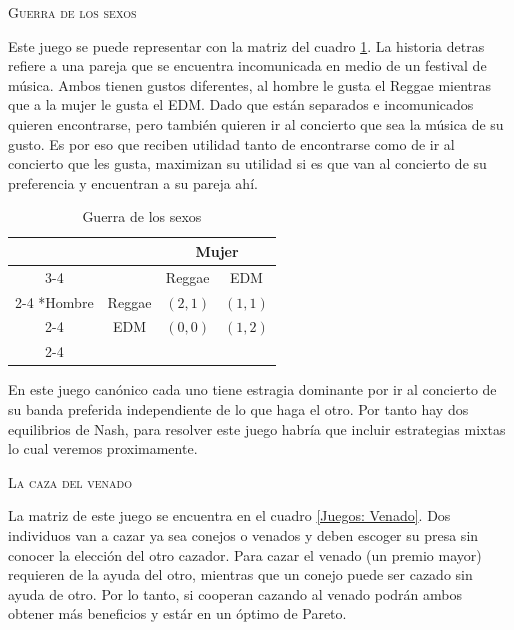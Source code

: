 
\textsc{Guerra de los sexos}

Este juego se puede representar con la matriz del cuadro \ref{Juegos: Guerra}. La historia detras refiere a una pareja que se encuentra incomunicada en medio de un festival de música. Ambos tienen gustos diferentes, al hombre le gusta el Reggae mientras que a la mujer le gusta el EDM. Dado que están separados e incomunicados quieren encontrarse, pero también quieren ir al concierto que sea la música de su gusto. Es por eso que reciben utilidad tanto de encontrarse como de ir al concierto que les gusta, maximizan su utilidad si es que van al concierto de su preferencia y encuentran a su pareja ahí.
\begin{table}[!htbp]
    \centering
    \caption{Guerra de los sexos}
    \setlength{\extrarowheight}{2pt}
    \begin{tabular}{*{4}{c|}}
      \multicolumn{2}{c}{} & \multicolumn{2}{c}{Mujer}\\\cline{3-4}
      \multicolumn{1}{c}{} &  & Reggae  & EDM \\\cline{2-4}
      \multirow{2}*{Hombre}  & Reggae & $(2,1)$ & $(1,1)$ \\\cline{2-4}
      & EDM & $(0,0)$ & $(1,2)$ \\\cline{2-4}
    \end{tabular} \label{Juegos: Guerra}
  \end{table}

En este juego canónico cada uno tiene estragia dominante por ir al concierto de su banda preferida independiente de lo que haga el otro. Por tanto hay dos equilibrios de Nash, para resolver este juego habría que incluir estrategias mixtas lo cual veremos proximamente.

\textsc{La caza del venado}

La matriz de este juego se encuentra en el cuadro \ref{Juegos: Venado}. Dos individuos van a cazar ya sea conejos o venados y deben escoger su presa sin conocer la elección del otro cazador. Para cazar el venado (un premio mayor) requieren de la ayuda del otro, mientras que un conejo puede ser cazado sin ayuda de otro. Por lo tanto, si cooperan cazando al venado podrán ambos obtener más beneficios y estár en un óptimo de Pareto.

